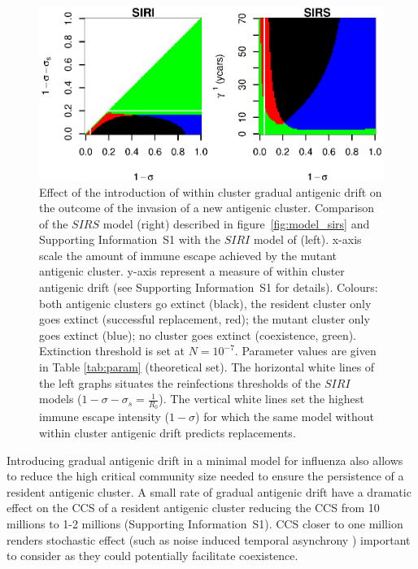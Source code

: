 \begin{figure}[!htbp]
\begin{center}
  \includegraphics[width=0.7\linewidth]{graphs/article1/figure_8.eps}
\end{center}
  \caption{ Effect of the introduction of within cluster gradual
    antigenic drift on the outcome of the invasion of a new antigenic
    cluster. Comparison of the $SIRS$ model (right) described in
    figure~\ref{fig:model_sirs} and Supporting Information~S1 with the
    $SIRI$ model of \cite{Goekaydin2007} (left). x-axis scale the
    amount of immune escape achieved by the mutant antigenic cluster.
    y-axis represent a measure of within cluster antigenic drift (see
    Supporting Information~S1 for details). Colours: both antigenic
    clusters go extinct (black), the resident cluster only goes
    extinct (successful replacement, red); the mutant cluster only
    goes extinct (blue); no cluster goes extinct (coexistence, green).
    Extinction threshold is set at $N=10^{-7}$. Parameter values are
    given in Table \ref{tab:param} (theoretical set). The horizontal
    white lines of the left graphs situates the reinfections
    thresholds of the $SIRI$ models
    ($1-\sigma-\sigma_s=\frac{1}{R_0}$). The vertical white lines set
    the highest immune escape intensity ($1-\sigma$) for which the
    same model without within cluster antigenic drift predicts
    replacements.}
\label{fig:within_drift}
\end{figure}


Introducing gradual antigenic drift in a minimal model for influenza
also allows to reduce the high critical community size needed to
ensure the persistence of a resident antigenic cluster. A small rate
of gradual antigenic drift have a dramatic effect on the CCS of a
resident antigenic cluster reducing the CCS from 10 millions to 1-2
millions (Supporting Information~S1). CCS closer to one million
renders stochastic effect (such as noise induced temporal asynchrony
\citep{Kamo2002}) important to consider as they could potentially
facilitate coexistence.

